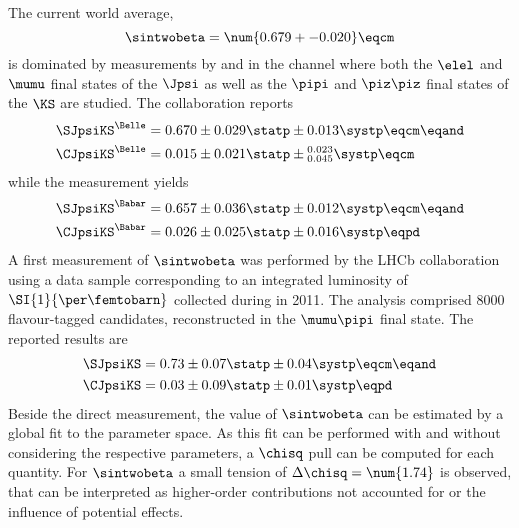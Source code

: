 The current world average, \cite{Amhis:2014hma}
%
\begin{equation*}
  \sintwobeta = \num{0.679 +- 0.020} \eqcm
\end{equation*}
%
is dominated by measurements by \Babar and \Belle in the \BdToJpsiKS channel
where both the $\elel$ and $\mumu$ final states of the $\Jpsi$ as well as the
$\pipi$ and $\piz\piz$ final states of the $\KS$ are studied. The \Belle
collaboration \cite{Adachi:2012et} reports
%
\begin{equation*}
  \begin{split}
    \SJpsiKS^{\text{\Belle}} &= 0.670 \pm 0.029 \statp \pm 0.013 \systp              \eqcm\eqand \\
    \CJpsiKS^{\text{\Belle}} &= 0.015 \pm 0.021 \statp \pm {}_{0.045}^{0.023} \systp \eqcm
  \end{split}
\end{equation*}
%
while the \Babar measurement \cite{Aubert:2009aw} yields
%
\begin{equation*}
  \begin{split}
    \SJpsiKS^{\text{\Babar}} &= 0.657 \pm 0.036 \statp \pm 0.012 \systp \eqcm\eqand \\
    \CJpsiKS^{\text{\Babar}} &= 0.026 \pm 0.025 \statp \pm 0.016 \systp \eqpd
  \end{split}
\end{equation*}
%
A first measurement of $\sintwobeta$ was performed by the \acs*{LHCb}
collaboration using a data sample corresponding to an integrated luminosity of
$\SI{1}{\per\femtobarn}$ collected during \RunOne in 2011. The analysis
comprised $\num{8000}$ flavour-tagged \BdToJpsiKS candidates, reconstructed in
the $\mumu\pipi$ final state. The reported results \cite{Aaij:1497268} are
%
\begin{equation*}
  \begin{split}
    \SJpsiKS &= 0.73 \pm 0.07 \statp \pm 0.04 \systp \eqcm\eqand \\
    \CJpsiKS &= 0.03 \pm 0.09 \statp \pm 0.01 \systp \eqpd
  \end{split}
\end{equation*}
%
Beside the direct measurement, the value of $\sintwobeta$ can be estimated by a
global fit to the \CKM parameter space. As this fit can be performed with and
without considering the respective parameters, a $\chisq$ pull can be computed
for each quantity. For $\sintwobeta$ a small tension of $\Delta\chisq =
\num{1.74}$ is observed, that can be interpreted as higher-order contributions
not accounted for or the influence of potential \BSM effects.
